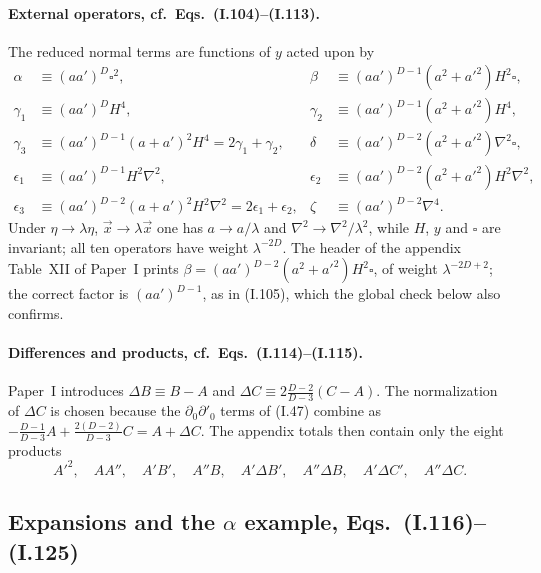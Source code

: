 \documentclass[aps,prd,onecolumn,10pt,nofootinbib,floatfix]{revtex4-2}
\newcommand{\PI}{Paper~I}
\newcommand{\eqI}[1]{(I.#1)}
\begin{document}
\paragraph*{External operators, cf.\ Eqs.~(I.104)--(I.113).}
The reduced normal terms are functions of $y$ acted upon by
\begin{equation}
\begin{aligned}
\alpha&\equiv(aa')^D\square^2, & \beta&\equiv(aa')^{D-1}(a^2+a'^2)H^2\square,\\
\gamma_1&\equiv(aa')^DH^4, & \gamma_2&\equiv(aa')^{D-1}(a^2+a'^2)H^4,\\
\gamma_3&\equiv(aa')^{D-1}(a+a')^2H^4=2\gamma_1+\gamma_2, & \delta&\equiv(aa')^{D-2}(a^2+a'^2)\nabla^2\square,\\
\epsilon_1&\equiv(aa')^{D-1}H^2\nabla^2, & \epsilon_2&\equiv(aa')^{D-2}(a^2+a'^2)H^2\nabla^2,\\
\epsilon_3&\equiv(aa')^{D-2}(a+a')^2H^2\nabla^2=2\epsilon_1+\epsilon_2, & \zeta&\equiv(aa')^{D-2}\nabla^4 .
\end{aligned}
\label{eq:s4b:ops}
\end{equation}
Under $\eta\to\lambda\eta$, $\vec x\to\lambda\vec x$ one has $a\to a/\lambda$ and $\nabla^2\to\nabla^2/\lambda^2$, while $H$,
$y$ and $\square$ are invariant; all ten operators have weight $\lambda^{-2D}$. The header of the appendix Table~XII
of \PI{} prints $\beta=(aa')^{D-2}(a^2+a'^2)H^2\square$, of weight $\lambda^{-2D+2}$; the correct factor is
$(aa')^{D-1}$, as in \eqI{105}, which the global check below also confirms.

\paragraph*{Differences and products, cf.\ Eqs.~(I.114)--(I.115).}
\PI{} introduces $\Delta B\equiv B-A$ and $\Delta C\equiv2\frac{D-2}{D-3}(C-A)$. The normalization of $\Delta C$ is chosen
because the $\partial_0\partial'_0$ terms of \eqI{47} combine as
$-\frac{D-1}{D-3}A+\frac{2(D-2)}{D-3}C=A+\Delta C$. The appendix totals then contain only the eight products
\begin{equation}
A'^2,\quad AA'',\quad A'B',\quad A''B,\quad A'\Delta B',\quad A''\Delta B,\quad A'\Delta C',\quad A''\Delta C .
\label{eq:s4b:products}
\end{equation}

\subsection{Expansions and the \texorpdfstring{$\alpha$}{alpha} example, Eqs.~(I.116)--(I.125)}
\label{sec:s4b:expansions}
\end{document}
